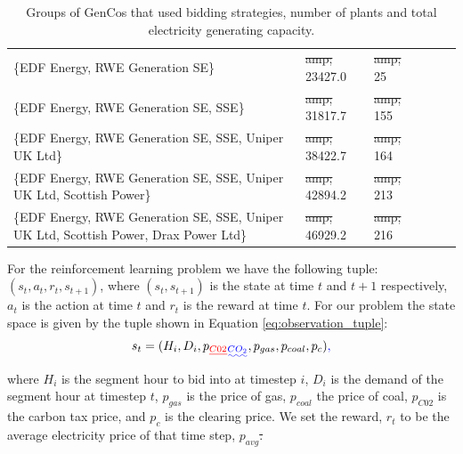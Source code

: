 \documentclass[conference]{IEEEtran}
\providecommand{\DIFadd}[1]{{\protect\color{blue}\uwave{#1}}} %
\providecommand{\DIFdel}[1]{{\protect\color{red}\sout{#1}}}                      %
\providecommand{\DIFaddbegin}{} %
\providecommand{\DIFaddend}{} %
\providecommand{\DIFdelbegin}{} %
\providecommand{\DIFdelend}{} %
\providecommand{\DIFdelFL}[1]{\DIFdel{#1}} %
\providecommand{\DIFdelbeginFL}{} %
\providecommand{\DIFdelendFL}{} %
\newcommand{\DIFscaledelfig}{0.5}
\newlength{\DIFdelgraphicswidth} %
\newlength{\DIFdelgraphicsheight} %
\newcommand{\DIFaddincludegraphics}[2][]{{\color{blue}\fbox{\DIFOincludegraphics[#1]{#2}}}} %
\newcommand{\DIFdelincludegraphics}[2][]{%
\sbox{\DIFdelgraphicsbox}{\DIFOincludegraphics[#1]{#2}}%
\settoboxwidth{\DIFdelgraphicswidth}{\DIFdelgraphicsbox} %
\settoboxtotalheight{\DIFdelgraphicsheight}{\DIFdelgraphicsbox} %
\scalebox{\DIFscaledelfig}{%
\parbox[b]{\DIFdelgraphicswidth}{\usebox{\DIFdelgraphicsbox}\\[-\baselineskip] \rule{\DIFdelgraphicswidth}{0em}}\llap{\resizebox{\DIFdelgraphicswidth}{\DIFdelgraphicsheight}{%
\setlength{\unitlength}{\DIFdelgraphicswidth}%
\begin{picture}(1,1)%
\thicklines\linethickness{2pt} %
{\color[rgb]{1,0,0}\put(0,0){\framebox(1,1){}}}%
{\color[rgb]{1,0,0}\put(0,0){\line( 1,1){1}}}%
{\color[rgb]{1,0,0}\put(0,1){\line(1,-1){1}}}%
\end{picture}%
}\hspace*{3pt}}} %
} %
\DeclareRobustCommand{\DIFaddbegin}{\DIFOaddbegin \let\includegraphics\DIFaddincludegraphics} %
\DeclareRobustCommand{\DIFaddend}{\DIFOaddend \let\includegraphics\DIFOincludegraphics} %
\DeclareRobustCommand{\DIFdelbegin}{\DIFOdelbegin \let\includegraphics\DIFdelincludegraphics} %
\DeclareRobustCommand{\DIFdelend}{\DIFOaddend \let\includegraphics\DIFOincludegraphics} %
\DeclareRobustCommand{\DIFdelbeginFL}{\DIFOdelbeginFL \let\includegraphics\DIFdelincludegraphics} %
\DeclareRobustCommand{\DIFdelendFL}{\DIFOaddendFL \let\includegraphics\DIFOincludegraphics} %
\begin{document}
\begin{table}
\begin{tabular}{llllll}
\{EDF Energy, RWE Generation SE\}                                                                                              & \DIFdelbeginFL \DIFdelFL{amp; }\DIFdelendFL 23427.0  & \DIFdelbeginFL \DIFdelFL{amp; }\DIFdelendFL 25               \\
\{EDF Energy, RWE Generation SE, SSE\}                                          & \DIFdelbeginFL \DIFdelFL{amp; }\DIFdelendFL 31817.7  & \DIFdelbeginFL \DIFdelFL{amp; }\DIFdelendFL 155              \\
\{EDF Energy, RWE Generation SE, SSE, Uniper UK Ltd\}                              & \DIFdelbeginFL \DIFdelFL{amp; }\DIFdelendFL 38422.7  & \DIFdelbeginFL \DIFdelFL{amp; }\DIFdelendFL 164              \\
\{EDF Energy, RWE Generation SE, SSE, Uniper UK Ltd, Scottish Power\}              & \DIFdelbeginFL \DIFdelFL{amp; }\DIFdelendFL 42894.2  & \DIFdelbeginFL \DIFdelFL{amp; }\DIFdelendFL 213              \\
\{EDF Energy, RWE Generation SE, SSE, Uniper UK Ltd, Scottish Power, Drax Power Ltd\} & \DIFdelbeginFL \DIFdelFL{amp; }\DIFdelendFL 46929.2  & \DIFdelbeginFL \DIFdelFL{amp; }\DIFdelendFL 216              \\ 
\bottomrule
\end{tabular}
\caption{Groups of GenCos that used bidding strategies, number of plants and total electricity generating capacity.}
\label{table:genco_table}
\end{table}


For the reinforcement learning problem we have the following tuple: $(s_t,a_t,r_t,s_{t+1})$, where $(s_t, s_{t+1})$ is the state at time $t$ and $t+1$ respectively, $a_t$ is the action at time $t$ and $r_t$ is the reward at time $t$. For our problem the state space is given by the tuple shown in Equation \ref{eq:observation_tuple}:
\begin{equation}
\label{eq:observation_tuple}
	s_t=(H_i,D_i,p\DIFdelbegin \DIFdel{_{C02}}\DIFdelend \DIFaddbegin \DIFadd{_{CO_{2}}}\DIFaddend ,p_{gas},p_{coal},p_{c})\DIFaddbegin \DIFadd{,
}\DIFaddend \end{equation}
\noindent where $H_i$ is the segment hour to bid into at timestep $i$, $D_i$ is the demand of the segment hour at timestep $t$, $p_{gas}$ is the price of gas, $p_{coal}$ the price of coal, \DIFdelbegin \DIFdel{$p_{C02}$ }\DIFdelend \DIFaddbegin \DIFadd{$p_{CO_{2}}$ }\DIFaddend is the carbon tax price, and $p_{c}$ is the clearing price. We set the reward, $r_t$ to be the average electricity price of that time step, $p_{avg}$\DIFdelbegin \DIFdel{.
}\DIFdelend \DIFaddbegin \DIFadd{, as shown by Equation \ref{eq:reward}:
}\DIFaddend 
\end{document}
